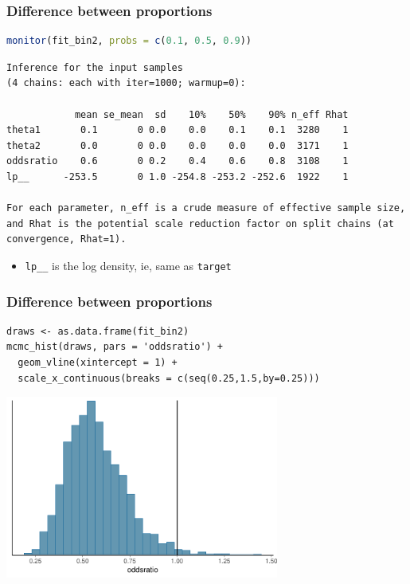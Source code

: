 \documentclass[10pt,handout]{beamer}
\begin{document}
\begin{frame}[fragile]

\frametitle{Difference between proportions}

  {\small
\begin{lstlisting}[language=R]
monitor(fit_bin2, probs = c(0.1, 0.5, 0.9))
\end{lstlisting}
  }

  {\scriptsize
\begin{lstlisting}
Inference for the input samples
(4 chains: each with iter=1000; warmup=0):

            mean se_mean  sd    10%    50%    90% n_eff Rhat
theta1       0.1       0 0.0    0.0    0.1    0.1  3280    1
theta2       0.0       0 0.0    0.0    0.0    0.0  3171    1
oddsratio    0.6       0 0.2    0.4    0.6    0.8  3108    1
lp__      -253.5       0 1.0 -254.8 -253.2 -252.6  1922    1

For each parameter, n_eff is a crude measure of effective sample size,
and Rhat is the potential scale reduction factor on split chains (at
convergence, Rhat=1).
\end{lstlisting}
  }

  \begin{itemize}
  \item<2-> {\tt lp\_\_} is the log density, ie, same as {\tt target}
  \end{itemize}

\end{frame}

\begin{frame}[fragile]

\frametitle{Difference between proportions}

  {\small
\begin{lstlisting}
draws <- as.data.frame(fit_bin2)
mcmc_hist(draws, pars = 'oddsratio') +
  geom_vline(xintercept = 1) +
  scale_x_continuous(breaks = c(seq(0.25,1.5,by=0.25)))
\end{lstlisting}
  }

  \begin{center}
  \includegraphics[width=9cm]{figs/betablockoddsratio.pdf}
\end{center}
\end{frame}
\end{document}
